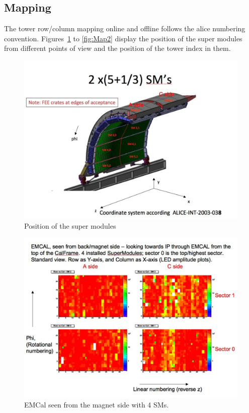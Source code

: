  
 \subsection{Mapping}
The tower row/column mapping online and offline follows the alice numbering convention. Figures~\ref{fig:Map1} to \ref{fig:Map2} display the position of the super modules from different points of view and the position of the tower index in them.

\begin{figure}[ht]
\begin{center}
\includegraphics[width=1.0\textwidth]{figures/EMCALMap0_0.pdf}
\end{center}
\caption{\label{fig:Map1}Position of the super modules}
\end{figure}

\begin{figure}[ht]
\begin{center}
\includegraphics[width=1.0\textwidth]{figures/EMCALMap1.pdf}
\end{center}
\caption{\label{fig:Map0}EMCal seen from the magnet side with 4 SMs.}
\end{figure}


